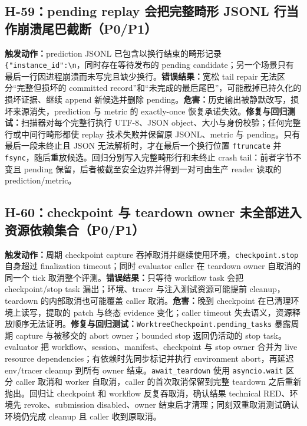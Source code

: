\documentclass[11pt,a4paper,fontset=fandol]{ctexart}
\newcommand{\code}[1]{\texttt{#1}}
\begin{document}
\subsection{H-59：pending replay 会把完整畸形 JSONL 行当作崩溃尾巴截断（P0/P1）}

\textbf{触发动作：}prediction JSONL 已包含以换行结束的畸形记录 \code{\{"instance\_id":\textbackslash n}，同时存在等待发布的 pending candidate；另一个场景只有最后一行因进程崩溃而未写完且缺少换行。\textbf{错误结果：}宽松 tail repair 无法区分“完整但损坏的 committed record”和“未完成的最后尾巴”，可能截掉已持久化的损坏证据、继续 append 新候选并删除 pending。\textbf{危害：}历史输出被静默改写，损坏来源消失，prediction 与 metric 的 exactly-once 恢复承诺失效。\textbf{修复与回归测试：}扫描器对每个完整行执行 UTF-8、JSON object、大小与身份校验；任何完整行或中间行畸形都使 replay 技术失败并保留原 JSONL、metric 与 pending。只有最后一段未终止且 JSON 无法解析时，才在最后一个换行位置 \code{ftruncate} 并 \code{fsync}，随后重放候选。回归分别写入完整畸形行和未终止 crash tail：前者字节不变且 pending 保留，后者被截至安全边界并得到一对可由生产 reader 读取的 prediction/metric。

\subsection{H-60：checkpoint 与 teardown owner 未全部进入资源依赖集合（P0/P1）}

\textbf{触发动作：}周期 checkpoint capture 吞掉取消并继续使用环境，\code{checkpoint.stop} 自身超过 finalization timeout；同时 evaluator caller 在 teardown owner 自取消的同一个 tick 取消整个评测。\textbf{错误结果：}只等待 workflow task 会把 checkpoint/stop task 漏出；环境、tracer 与注入测试资源可能提前 cleanup，teardown 的内部取消也可能覆盖 caller 取消。\textbf{危害：}晚到 checkpoint 在已清理环境上读写，提取的 patch 与终态 evidence 变化；caller timeout 失去语义，资源释放顺序无法证明。\textbf{修复与回归测试：}\code{WorktreeCheckpoint.pending\_tasks} 暴露周期 capture 与被移交的 abort owner；bounded stop 返回仍活动的 stop task。evaluator 把 workflow、session、manifest、checkpoint 与 stop owner 合并为 live resource dependencies；有依赖时先同步标记并执行 environment abort，再延迟 env/tracer cleanup 到所有 owner 结束。\code{await\_teardown} 使用 \code{asyncio.wait} 区分 caller 取消和 worker 自取消，caller 的首次取消保留到完整 teardown 之后重新抛出。回归让 checkpoint 和 workflow 反复吞取消，确认结果 technical RED、环境先 revoke、submission disabled、owner 结束后才清理；同刻双重取消测试确认环境仍完成 cleanup 且 caller 收到原取消。
\end{document}
